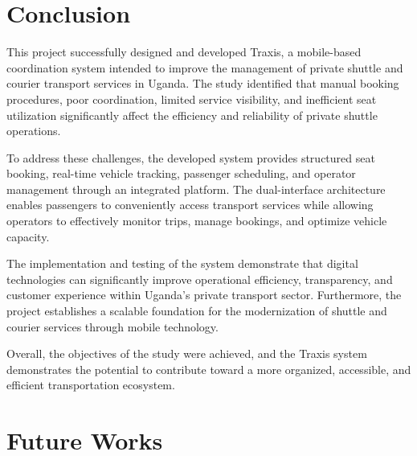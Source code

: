 \section{Conclusion}
This project successfully designed and developed Traxis, a mobile-based coordination system intended to improve the management of private shuttle and courier transport services in Uganda. The study identified that manual booking procedures, poor coordination, limited service visibility, and inefficient seat utilization significantly affect the efficiency and reliability of private shuttle operations.

To address these challenges, the developed system provides structured seat booking, real-time vehicle tracking, passenger scheduling, and operator management through an integrated platform. The dual-interface architecture enables passengers to conveniently access transport services while allowing operators to effectively monitor trips, manage bookings, and optimize vehicle capacity.

The implementation and testing of the system demonstrate that digital technologies can significantly improve operational efficiency, transparency, and customer experience within Uganda's private transport sector. Furthermore, the project establishes a scalable foundation for the modernization of shuttle and courier services through mobile technology.

Overall, the objectives of the study were achieved, and the Traxis system demonstrates the potential to contribute toward a more organized, accessible, and efficient transportation ecosystem.

\section{Future Works}

